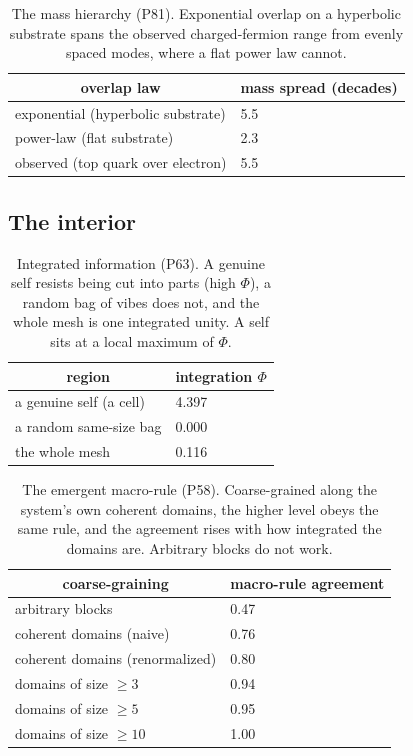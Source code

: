 \begin{table}[H]
\centering
\small
\begin{tabular}{ll}
\toprule
\multicolumn{1}{c}{overlap law} & \multicolumn{1}{c}{mass spread (decades)} \\
\midrule
exponential (hyperbolic substrate) & 5.5 \\
power-law (flat substrate) & 2.3 \\
observed (top quark over electron) & 5.5 \\
\bottomrule
\end{tabular}
\caption{The mass hierarchy (P81). Exponential overlap on a hyperbolic substrate spans the observed charged-fermion range from evenly spaced modes, where a flat power law cannot.}
\end{table}

\subsection{The interior}

\begin{table}[H]
\centering
\small
\begin{tabular}{ll}
\toprule
\multicolumn{1}{c}{region} & \multicolumn{1}{c}{integration $\Phi$} \\
\midrule
a genuine self (a cell) & 4.397 \\
a random same-size bag & 0.000 \\
the whole mesh & 0.116 \\
\bottomrule
\end{tabular}
\caption{Integrated information (P63). A genuine self resists being cut into parts (high $\Phi$), a random bag of vibes does not, and the whole mesh is one integrated unity. A self sits at a local maximum of $\Phi$.}
\end{table}

\begin{table}[H]
\centering
\small
\begin{tabular}{ll}
\toprule
\multicolumn{1}{c}{coarse-graining} & \multicolumn{1}{c}{macro-rule agreement} \\
\midrule
arbitrary blocks & 0.47 \\
coherent domains (naive) & 0.76 \\
coherent domains (renormalized) & 0.80 \\
domains of size $\ge 3$ & 0.94 \\
domains of size $\ge 5$ & 0.95 \\
domains of size $\ge 10$ & 1.00 \\
\bottomrule
\end{tabular}
\caption{The emergent macro-rule (P58). Coarse-grained along the system's own coherent domains, the higher level obeys the same rule, and the agreement rises with how integrated the domains are. Arbitrary blocks do not work.}
\end{table}

